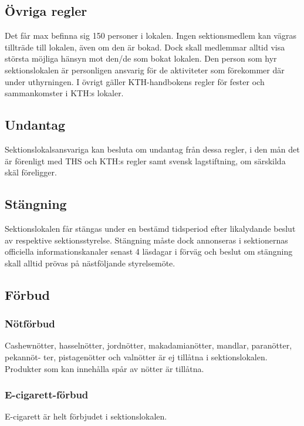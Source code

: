 \documentclass{dgovdoc}
\begin{document}
\subsection{Övriga regler}

Det får max befinna sig 150 personer i lokalen. Ingen sektionsmedlem kan vägras
tillträde till lokalen, även om den är bokad. Dock skall medlemmar alltid visa
största möjliga hänsyn mot den/de som bokat lokalen. Den person som hyr
sektionslokalen är personligen ansvarig för de aktiviteter som förekommer där
under uthyrningen. I övrigt gäller KTH-handbokens regler för fester och
sammankomster i KTH:s lokaler.

\subsection{Undantag}

Sektionslokalsansvariga kan besluta om undantag från dessa regler, i den mån
det är förenligt med THS och KTH:s regler samt svensk lagstiftning, om
särskilda skäl föreligger.

\subsection{Stängning}
\label{sec:sektionslokal-stangning}

Sektionslokalen får stängas under en bestämd tidsperiod efter likalydande beslut av respektive
sektionsstyrelse. Stängning måste dock annonseras i sektionernas officiella informationskanaler senast 4 läsdagar i förväg och beslut om stängning skall alltid prövas på nästföljande styrelsemöte.


\subsection{Förbud}

\subsubsection{Nötförbud}
Cashewnötter, hasselnötter, jordnötter, makadamianötter, mandlar, paranötter, pekannöt-
ter, pistagenötter och valnötter är ej tillåtna i sektionslokalen. Produkter som kan innehålla
spår av nötter är tillåtna.

\subsubsection{E-cigarett-förbud}
E-cigarett är helt förbjudet i sektionslokalen.
\end{document}
